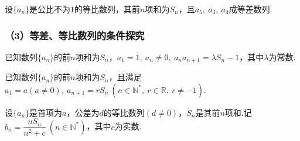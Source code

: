 \documentclass{BHCexam}
\begin{document}
\begin{questions}
\qs  设$\{a_n\}$是公比不为$1$的等比数列，其前$n$项和为$S_n$，且$a_5,~a_3,~a_4$成等差数列.
\kongbai
\subsubsection*{（3）等差、等比数列的条件探究}

\qs  已知数列$\{a_n\}$的前$n$项和为$S_n$，$a_1=1,~a_n\neq 0,~a_na_{n+1}=\lambda S_n-1$，其中$\lambda$为常数.
\kongbai

\qs  已知数列$\{a_n\}$的前$n$项和为$S_n$，且满足$a_1=a(a\neq0),~a_{n+1}=rS_n~(n\in \mathbb{N}^*,~r\in \mathbb{R},~r\neq -1)$.
\kongbai

\qs 设$\{a_n\}$是首项为$a$，公差为$d$的等比数列$(d\neq0)$，$S_n$是其前$n$项和.记$b_n=\dfrac{nS_n}{n^2+c} ~(n\in \mathbb{N}^*)$，其中$c$为实数.
\begin{parts}

\end{parts}
\end{questions}
\end{document}
